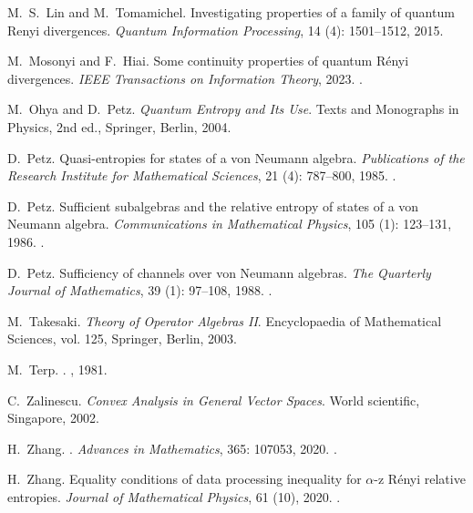 \documentclass[12pt]{article}
\theoremstyle{definition}
\theoremstyle{remark}
\numberwithin{equation}{section}
\begin{document}
\begin{thebibliography}{27}
M.~S.~Lin and M.~Tomamichel.
\newblock Investigating properties of a family of quantum Renyi divergences.
\newblock \emph{Quantum Information Processing}, 14
 (4): 1501--1512, 2015.

M.~Mosonyi and F.~Hiai.
\newblock Some continuity properties of quantum {R}ényi divergences.
\newblock \emph{IEEE Transactions on Information Theory}, 2023.
\newblock {}.

M.~Ohya and D.~Petz.
\newblock \emph{Quantum Entropy and Its Use}.
\newblock Texts and Monographs in Physics, 2nd ed., Springer, Berlin, 2004.

D.~Petz.
\newblock Quasi-entropies for states of a von {N}eumann algebra.
\newblock \emph{Publications of the Research Institute for Mathematical
  Sciences}, 21 (4): 787--800, 1985.
\newblock {}.

D.~Petz.
\newblock Sufficient subalgebras and the relative entropy of states of a von
  {Neumann} algebra.
\newblock \emph{Communications in Mathematical Physics}, 105
  (1): 123--131, 1986.
\newblock {}.

D.~Petz.
\newblock Sufficiency of channels over von {Neumann} algebras.
\newblock \emph{The Quarterly Journal of Mathematics}, 39
  (1): 97--108, 1988.
\newblock {}.

M.~Takesaki.
\newblock \emph{Theory of Operator Algebras II}.
\newblock Encyclopaedia of Mathematical Sciences, vol. 125, Springer, Berlin, 2003.

M.~Terp.
.
, {1981}.

C.~Zalinescu.
\newblock \emph{Convex Analysis in General Vector Spaces}.
\newblock World scientific, Singapore, 2002.

H.~Zhang.
.
\newblock \emph{Advances in Mathematics}, 365: 107053,
  2020{}.
\newblock {}.

H.~Zhang.
\newblock Equality conditions of data processing inequality for $\alpha$-z
  {R}{\'e}nyi relative entropies.
\newblock \emph{Journal of Mathematical Physics}, 61 (10),
  2020{}.
\newblock {}.

\end{thebibliography}

%
%
\end{document}
